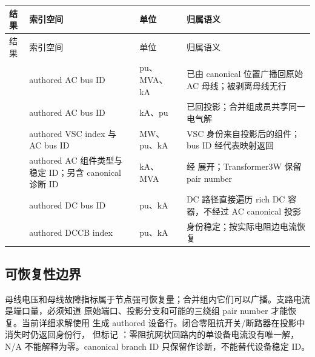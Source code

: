 \begin{center}\footnotesize
\begin{longtable}{@{}L{3.3cm}L{3.2cm}L{2.2cm}L{5.4cm}@{}}
\toprule
结果 & 索引空间 & 单位 & 归属语义\\
\midrule
\endfirsthead
\toprule
结果 & 索引空间 & 单位 & 归属语义\\
\midrule
\endhead
{} & authored AC bus ID & pu、MVA、kA & 已由 canonical 位置广播回原始 AC 母线；被剥离母线无行\\
 & authored AC bus ID & kA、pu & 已回投影；合并组成员共享同一电气解\\
 & authored VSC index 与 AC bus ID & MW、pu、kA & VSC 身份来自投影后的组件；bus ID 经代表映射返回\\
 & authored AC 组件类型与稳定 ID；另含 canonical 诊断 ID & kA、MVA & 经  展开；Transformer3W 保留 pair number\\
 & authored DC bus ID & pu、kA & DC 路径直接遍历 rich DC 容器，不经过 AC canonical 投影\\
 & authored DCCB index & pu、kA & 身份稳定；按实际电阻边电流恢复\\
\bottomrule
\end{longtable}
\end{center}

\subsection{可恢复性边界}

母线电压和母线故障指标属于节点强可恢复量；合并组内它们可以广播。支路电流是端口量，必须知道
原始端口、投影分支和可能的三绕组 pair number 才能恢复。当前详细求解使用
 生成 authored 设备行。闭合零阻抗开关/断路器在投影中消失时仍返回身份行，
但标记 ：零阻抗网状回路内的单设备电流没有唯一解，N/A
不能解释为零。canonical branch ID 只保留作诊断，不能替代设备稳定 ID。
